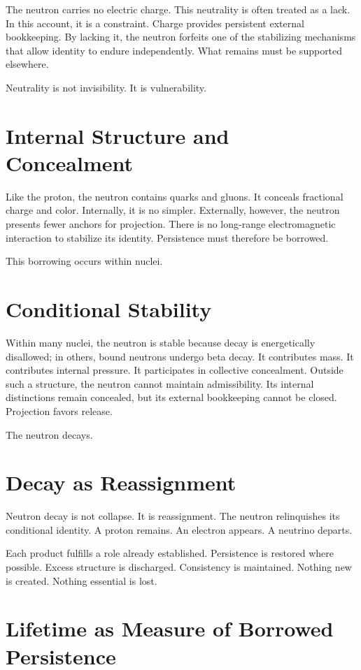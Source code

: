 \documentclass[11pt,twoside,openright]{book}
\begin{document}
The neutron carries no electric charge. This neutrality is often treated as a lack. In this account, it is a constraint. Charge provides persistent external bookkeeping. By lacking it, the neutron forfeits one of the stabilizing mechanisms that allow identity to endure independently. What remains must be supported elsewhere.

Neutrality is not invisibility. It is vulnerability.

\section*{Internal Structure and Concealment}

Like the proton, the neutron contains quarks and gluons. It conceals fractional charge and color. Internally, it is no simpler. Externally, however, the neutron presents fewer anchors for projection. There is no long-range electromagnetic interaction to stabilize its identity. Persistence must therefore be borrowed.

This borrowing occurs within nuclei.

\section*{Conditional Stability}

Within many nuclei, the neutron is stable because decay is energetically disallowed; in others, bound neutrons undergo beta decay. It contributes mass. It contributes internal pressure. It participates in collective concealment. Outside such a structure, the neutron cannot maintain admissibility. Its internal distinctions remain concealed, but its external bookkeeping cannot be closed. Projection favors release.

The neutron decays.

\section*{Decay as Reassignment}

Neutron decay is not collapse. It is reassignment. The neutron relinquishes its conditional identity. A proton remains. An electron appears. A neutrino departs.

Each product fulfills a role already established. Persistence is restored where possible. Excess structure is discharged. Consistency is maintained. Nothing new is created. Nothing essential is lost.

\section*{Lifetime as Measure of Borrowed Persistence}
\end{document}
